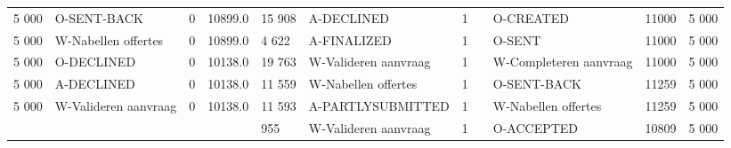 \begin{tabular}{lllllllllll}
5 000 & O-SENT-BACK & 0 & 10899.0 & 15 908 & A-DECLINED & 1 &  & O-CREATED & 11000 & 5 000 \\
5 000 & W-Nabellen offertes & 0 & 10899.0 & 4 622 & A-FINALIZED & 1 &  & O-SENT & 11000 & 5 000 \\
5 000 & O-DECLINED & 0 & 10138.0 & 19 763 & W-Valideren aanvraag & 1 &  & W-Completeren aanvraag & 11000 & 5 000 \\
5 000 & A-DECLINED & 0 & 10138.0 & 11 559 & W-Nabellen offertes & 1 &  & O-SENT-BACK & 11259 & 5 000 \\
5 000 & W-Valideren aanvraag & 0 & 10138.0 & 11 593 & A-PARTLYSUBMITTED & 1 &  & W-Nabellen offertes & 11259 & 5 000 \\
 &  &  &  & 955 & W-Valideren aanvraag & 1 &  & O-ACCEPTED & 10809 & 5 000 \\
\bottomrule
\end{tabular}
